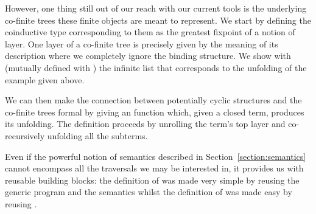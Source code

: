 \begin{minipage}{\textwidth}
\begin{minipage}{0.52\textwidth}
\end{minipage}
\newline
\begin{minipage}{0.43\textwidth}
\end{minipage}
\end{minipage}

However, one thing still out of our reach with our current tools is
the underlying co-finite trees these finite objects are meant to
represent. We start by defining the coinductive type corresponding to
them as the greatest fixpoint of a notion of layer. One layer of a
co-finite tree is precisely given by the meaning of its description
where we completely ignore the binding structure. We show with
 (mutually defined with ) the infinite list that
corresponds to the unfolding of the example  given above.


\begin{minipage}{\textwidth}
  \newline
\begin{minipage}{0.4\textwidth}
\end{minipage}\qquad
\begin{minipage}{0.4\textwidth}
\end{minipage}
\end{minipage}

We can then make the connection between potentially cyclic
structures and the co-finite trees formal by giving an 
function which, given a closed term, produces its unfolding.
The definition proceeds by unrolling the term's top layer and
co-recursively unfolding all the subterms.

\begin{agdasnippet}
\end{agdasnippet}

Even if the
powerful notion of semantics described in Section~\ref{section:semantics}
cannot encompass all the traversals we may be interested in,
it provides us with reusable building blocks: the definition
of  was made very simple by reusing the generic
program  and the  semantics whilst
the definition of  was made easy by reusing .
